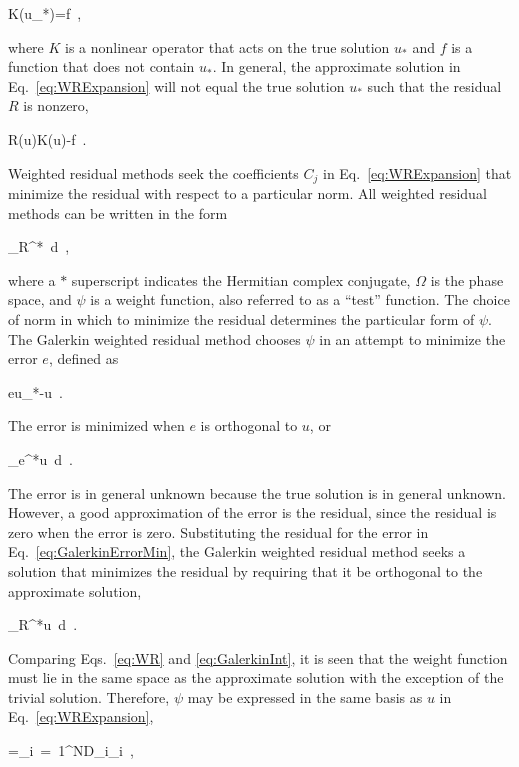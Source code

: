 \beq
\label{eq:linear1}
K(u_*)=f\ ,
\eeq

\noindent where \(K\) is a nonlinear operator that acts on the true solution \(u_*\) and \(f\) is a function that does not contain \(u_*\). In general, the approximate solution in Eq.\ \eqref{eq:WRExpansion} will not equal the true solution \(u_*\) such that the residual \(R\) is nonzero,

\beq
\label{eq:residual}
R(u)\equiv K(u)-f\ .
\eeq

\noindent Weighted residual methods seek the coefficients \(C_j\) in Eq.\ \eqref{eq:WRExpansion} that minimize the residual with respect to a particular norm. All weighted residual methods can be written in the form

\beq
\label{eq:WR}
\int_\Omega R^*\psi\ d\ ,
\eeq

\noindent where a \(*\) superscript indicates the Hermitian complex conjugate, \(\Omega\) is the phase space, and \(\psi\) is a weight function, also referred to as a ``test'' function. The choice of norm in which to minimize the residual determines the particular form of \(\psi\). The Galerkin weighted residual method chooses \(\psi\) in an attempt to minimize the error \(e\), defined as

\beq
\label{eq:error123}
e\equiv u_*-u\ .
\eeq

\noindent The error is minimized when \(e\) is orthogonal to \(u\), or

\beq
\label{eq:GalerkinErrorMin}
\int_{\Omega}e^*u\ d\ .
\eeq

\noindent The error is in general unknown because the true solution is in general unknown. However, a good approximation of the error is the residual, since the residual is zero when the error is zero. Substituting the residual for the error in Eq.\ \eqref{eq:GalerkinErrorMin}, the Galerkin weighted residual method seeks a solution that minimizes the residual by requiring that it be orthogonal to the approximate solution,

\beq
\label{eq:GalerkinInt}
\int_{\Omega}R^*u\ d\ .
\eeq

\noindent Comparing Eqs.\ \eqref{eq:WR} and \eqref{eq:GalerkinInt}, it is seen that the weight function must lie in the same space as the approximate solution with the exception of the trivial solution. Therefore, \(\psi\) may be expressed in the same basis as \(u\) in Eq.\ \eqref{eq:WRExpansion},

\beq
\label{eq:PsiExpansion}
\psi=\sum_{i\ =\ 1}^ND_i\phi_i\ ,
\eeq

